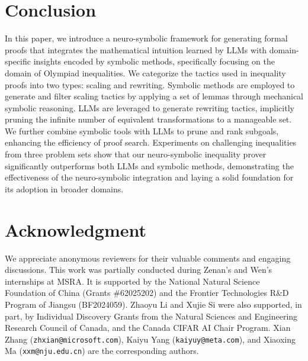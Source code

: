 \section{Conclusion}
\label{sec:conclusion}
In this paper, we introduce a neuro-symbolic framework for generating formal proofs that integrates the mathematical intuition learned by LLMs with domain-specific insights encoded by symbolic methods, specifically focusing on the domain of Olympiad inequalities. We categorize the tactics used in inequality proofs into two types: scaling and rewriting. Symbolic methods are employed to generate and filter scaling tactics by applying a set of lemmas through mechanical symbolic reasoning. LLMs are leveraged to generate rewriting tactics, implicitly pruning the infinite number of equivalent transformations to a manageable set. We further combine symbolic tools with LLMs to prune and rank subgoals, enhancing the efficiency of proof search. Experiments on challenging inequalities from three problem sets show that our neuro-symbolic inequality prover \name significantly outperforms both LLMs and symbolic methods, demonstrating the effectiveness of the neuro-symbolic integration and laying a solid foundation for its adoption in broader domains.


\newpage

\section*{Acknowledgment}
We appreciate anonymous reviewers for their valuable comments and engaging discussions. This work was partially conducted during Zenan’s and Wen's internships at MSRA. It is supported by the National Natural Science Foundation of China (Grants \#62025202) and the Frontier Technologies R\&D Program of Jiangsu (BF2024059). Zhaoyu Li and Xujie Si were also supported, in part, by Individual Discovery Grants from the Natural Sciences and Engineering Research Council of Canada, and the Canada CIFAR AI Chair Program. Xian Zhang (\texttt{zhxian@microsoft.com}), Kaiyu Yang (\texttt{kaiyuy@meta.com}), and Xiaoxing Ma (\texttt{xxm@nju.edu.cn}) are the corresponding authors. 
